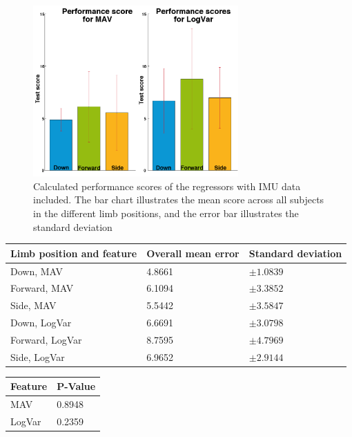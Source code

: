 \begin{figure}[H]
	\includegraphics[width=0.7\textwidth]{figures/results/GotItTimeIMU}  %
	\caption{Calculated performance scores of the regressors with IMU data included. The bar chart illustrates the mean score across all subjects in the different limb positions, and the error bar illustrates the standard deviation}
	\label{fig:gotItTimeIMU}  %
\end{figure}

	\begin{center}
		\begin{tabular}{l l l}
			\toprule
			\textbf{Limb position and feature} & \textbf{Overall mean error} & \textbf{Standard deviation}\\
			\midrule
			Down, MAV & 4.8661 & $\pm 1.0839$ \\
			Forward, MAV & 6.1094 & $\pm 3.3852$ \\
			Side, MAV & 5.5442 & $\pm 3.5847$ \\
			Down, LogVar & 6.6691 & $\pm 3.0798$ \\
			Forward, LogVar & 8.7595 & $\pm 4.7969$ \\
			Side, LogVar & 6.9652 & $\pm 2.9144$ \\
			\bottomrule
		\end{tabular}
	\end{center}
	
		\begin{center}
			\begin{tabular}{l l}
				\toprule
				\textbf{Feature} & \textbf{P-Value}\\
				\midrule
				MAV & 0.8948 \\
				LogVar & 0.2359 \\
				\bottomrule
			\end{tabular}
		\end{center}

